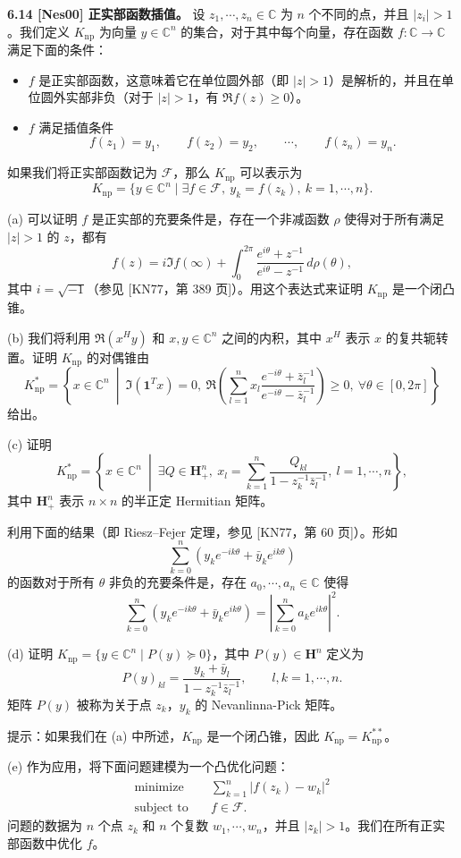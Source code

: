 \documentclass[UTF8, 12pt, fontset=fandol, oneside]{ctexart}
\begin{document}
\noindent\textbf{6.14 [Nes00] 正实部函数插值。}\quad
设 $z_1,\cdots,z_n\in\mathbb{C}$ 为 $n$ 个不同的点，并且 $|z_i|>1$。我们定义 $K_{\mathrm{np}}$ 为向量 $y\in\mathbb{C}^n$ 的集合，对于其中每个向量，存在函数 $f:\mathbb{C}\to\mathbb{C}$ 满足下面的条件：
\begin{itemize}
\item $f$ 是正实部函数，这意味着它在单位圆外部（即 $|z|>1$）是解析的，并且在单位圆外实部非负（对于 $|z|>1$，有 $\Re f(z)\geq 0$）。
\item $f$ 满足插值条件
\[
f(z_1)=y_1,\qquad f(z_2)=y_2,\qquad \cdots,\qquad f(z_n)=y_n.
\]
\end{itemize}
如果我们将正实部函数记为 $\mathcal{F}$，那么 $K_{\mathrm{np}}$ 可以表示为
\[
K_{\mathrm{np}}=\{y\in\mathbb{C}^n\mid \exists f\in\mathcal{F},\ y_k=f(z_k),\ k=1,\cdots,n\}.
\]

(a) 可以证明 $f$ 是正实部的充要条件是，存在一个非减函数 $\rho$ 使得对于所有满足 $|z|>1$ 的 $z$，都有
\[
f(z)=i\Im f(\infty)+\int_0^{2\pi}\frac{e^{i\theta}+z^{-1}}{e^{i\theta}-z^{-1}}\,d\rho(\theta),
\]
其中 $i=\sqrt{-1}$（参见 [KN77，第 389 页]）。用这个表达式来证明 $K_{\mathrm{np}}$ 是一个闭凸锥。

(b) 我们将利用 $\Re(x^Hy)$ 和 $x,y\in\mathbb{C}^n$ 之间的内积，其中 $x^H$ 表示 $x$ 的复共轭转置。证明 $K_{\mathrm{np}}$ 的对偶锥由
\[
K_{\mathrm{np}}^*=
\left\{x\in\mathbb{C}^n\ \middle|\ 
\Im(\mathbf{1}^Tx)=0,\ 
\Re\left(\sum_{l=1}^n x_l\frac{e^{-i\theta}+\bar{z}_l^{-1}}{e^{-i\theta}-\bar{z}_l^{-1}}\right)\geq 0,\ \forall\theta\in[0,2\pi]
\right\}
\]
给出。

(c) 证明
\[
K_{\mathrm{np}}^*=
\left\{x\in\mathbb{C}^n\ \middle|\ 
\exists Q\in\mathbf{H}_+^n,\ x_l=\sum_{k=1}^n\frac{Q_{kl}}{1-z_k^{-1}\bar{z}_l^{-1}},\ l=1,\cdots,n
\right\},
\]
其中 $\mathbf{H}_+^n$ 表示 $n\times n$ 的半正定 Hermitian 矩阵。

利用下面的结果（即 Riesz--Fejer 定理，参见 [KN77，第 60 页]）。形如
\[
\sum_{k=0}^n(y_ke^{-ik\theta}+\bar{y}_ke^{ik\theta})
\]
的函数对于所有 $\theta$ 非负的充要条件是，存在 $a_0,\cdots,a_n\in\mathbb{C}$ 使得
\[
\sum_{k=0}^n(y_ke^{-ik\theta}+\bar{y}_ke^{ik\theta})
=\left|\sum_{k=0}^n a_ke^{ik\theta}\right|^2.
\]

(d) 证明 $K_{\mathrm{np}}=\{y\in\mathbb{C}^n\mid P(y)\succeq 0\}$，其中 $P(y)\in\mathbf{H}^n$ 定义为
\[
P(y)_{kl}=\frac{y_k+\bar{y}_l}{1-z_k^{-1}\bar{z}_l^{-1}},\qquad l,k=1,\cdots,n.
\]
矩阵 $P(y)$ 被称为关于点 $z_k$，$y_k$ 的 Nevanlinna-Pick 矩阵。

提示：如果我们在 (a) 中所述，$K_{\mathrm{np}}$ 是一个闭凸锥，因此 $K_{\mathrm{np}}=K_{\mathrm{np}}^{**}$。

(e) 作为应用，将下面问题建模为一个凸优化问题：
\[
\begin{aligned}
\text{minimize}\quad & \sum_{k=1}^n |f(z_k)-w_k|^2\\
\text{subject to}\quad & f\in\mathcal{F}.
\end{aligned}
\]
问题的数据为 $n$ 个点 $z_k$ 和 $n$ 个复数 $w_1,\cdots,w_n$，并且 $|z_k|>1$。我们在所有正实部函数中优化 $f$。
\end{document}
